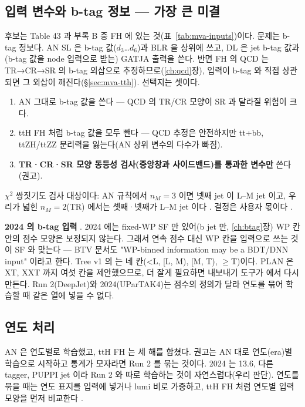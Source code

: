 \subsection{입력 변수와 b-tag 정보 — 가장 큰 미결}\label{sec:mva-ours-btag}

후보는 Table 43 과 부록 B 중 FH 에 있는 것(표~\ref{tab:mva-inputs})이다. 문제는 b-tag 정보다. AN SL 은 b-tag 값($d_3$…$d_6$)과 BLR 을 상위에 쓰고,
DL 은 jet b-tag 값과 (b-tag 값을 node 입력으로 받는) GATJA 출력을 쓴다. 반면 FH 의 QCD 는 TR→CR→SR 의
b-tag 외삽으로 추정하므로(\ref{ch:qcd}장), 입력이 b-tag 와 직접 상관되면 그 외삽이 깨진다(\S\ref{sec:mva-tth}). 선택지는 셋이다.
\begin{enumerate}
\item AN 그대로 b-tag 값을 쓴다 — QCD 의 TR/CR 모양이 SR 과 달라질 위험이 크다.
\item ttH FH 처럼 b-tag 값을 모두 뺀다 — QCD 추정은 안전하지만 tt+bb, ttZH/ttZZ 분리력을 잃는다(AN 상위 변수의 다수가 빠짐).
\item \textbf{TR·CR·SR 모양 동등성 검사(중앙창과 사이드밴드)를 통과한 변수만} 쓴다(권고).
\end{enumerate}
$\chi^2$ 쌍짓기도 검사 대상이다: AN 규칙에서 $n_M=3$ 이면 넷째 jet 이 L--M jet 이고, 우리가 넓힌 $n_M=2$(TR) 에서는 셋째·넷째가 L--M jet 이다
. 결정은 사용자 몫이다 \tagopen.

\textbf{2024 의 b-tag 입력} \tagrunthree. 2024 에는 fixed-WP SF 만 있어(b jet 만, \ref{ch:btag}장) WP 칸 안의 점수 모양은 보정되지 않는다. 그래서 연속 점수
대신 WP 칸을 입력으로 쓰는 것이 SF 와 맞는다 — BTV 문서도 "WP-binned information may be a BDT/DNN input" 이라고 한다.
Tree v1 의  는 네 칸(\textless L, [L, M), [M, T), $\ge$T)이다. PLAN 은 XT, XXT 까지 여섯 칸을
제안했으므로, 더 잘게 필요하면 내보내기 도구가  에서 다시 만든다. Run 2(DeepJet)와 2024(UParTAK4)는 점수의
정의가 달라 연도를 묶어 학습할 때 같은 열에 넣을 수 없다.

\subsection{연도 처리}\label{sec:mva-ours-years}

AN 은 연도별로 학습했고, ttH FH 는 세 해를 합쳤다. 권고는 AN 대로 연도(era)별 학습으로 시작하고
통계가 모자라면 Run 2 를 묶는 것이다. 2024 는 13.6\TeV, 다른 tagger, PUPPI jet 이라 Run 2 와 따로 학습하는 것이 자연스럽다(우리 판단).
연도를 묶을 때는 연도 표지를 입력에 넣거나 lumi 비로 가중하고, ttH FH 처럼 연도별 입력 모양을 먼저 비교한다 \tagopen.

